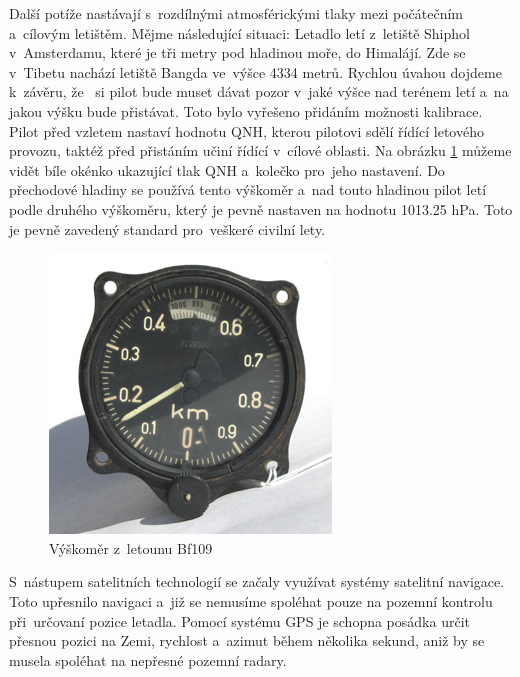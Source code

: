		Další potíže nastávají s~rozdílnými atmosférickými tlaky mezi počátečním a~cílovým letištěm. Mějme následující situaci: Letadlo letí z~letiště Shiphol v~Amsterdamu, které je tři metry pod hladinou moře, do Himalájí. Zde se v~Tibetu nachází letiště Bangda ve~výšce 4334 metrů\cite{bangda}. Rychlou úvahou dojdeme k~závěru, že~ si pilot bude muset dávat pozor v~jaké výšce nad terénem letí a~na jakou výšku bude přistávat. Toto bylo vyřešeno přidáním možnosti kalibrace. Pilot před vzletem nastaví hodnotu QNH, kterou pilotovi sdělí řídící letového provozu, taktéž před přistáním učiní řídící v~cílové oblasti. Na obrázku \ref{historie::vyvojMereniVysky::109Altimeter} můžeme vidět bíle okénko ukazující tlak QNH a~kolečko pro~jeho nastavení. Do přechodové hladiny se používá tento výškoměr a~nad touto hladinou pilot letí podle druhého výškoměru, který je pevně nastaven na hodnotu 1013.25 hPa. Toto je pevně zavedený standard pro~veškeré civilní lety.\par
		
		\begin{figure}[H]
			\begin{center}
				\includegraphics[scale=0.65]{obrazky-figures/109Altimeter.jpg}
				\caption{Výškoměr z~letounu Bf109\protect\footnotemark}\label{historie::vyvojMereniVysky::109Altimeter}
			\end{center}
		\end{figure}
		
		S~nástupem satelitních technologií se začaly využívat systémy satelitní navigace. Toto upřesnilo navigaci a~již se nemusíme spoléhat pouze na pozemní kontrolu při~určovaní pozice letadla. Pomocí systému GPS je schopna posádka určit přesnou pozici na Zemi, rychlost a~azimut během několika sekund, aniž by se musela spoléhat na nepřesné pozemní radary.\par 
		
